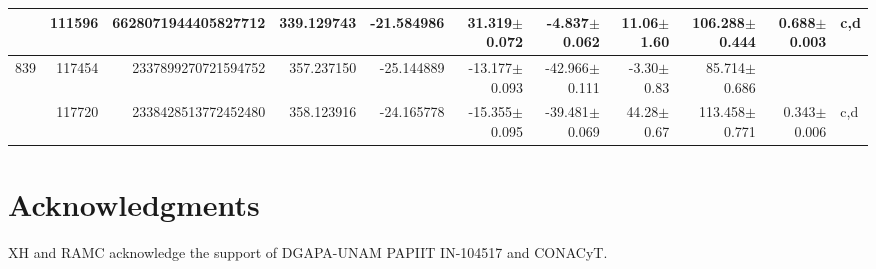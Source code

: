 \documentclass{ws-ijmpd}
\begin{document}
\begin{landscape}
\begin{longtable}{rrrrrrrrrrl}
            &  111596 &      6628071944405827712 &                   339.129743 &                   -21.584986 &                 31.319$\pm$0.072 &                 -4.837$\pm$0.062 &          11.06$\pm$  1.60 &       106.288$\pm$0.444 &                           0.688$\pm$0.003 &                                                c,d \\
 \hline 839 &  117454 &      2337899270721594752 &                   357.237150 &                   -25.144889 &                -13.177$\pm$0.093 &                -42.966$\pm$0.111 &          -3.30$\pm$  0.83 &        85.714$\pm$0.686 &                                           &                                                    \\
            &  117720 &      2338428513772452480 &                   358.123916 &                   -24.165778 &                -15.355$\pm$0.095 &                -39.481$\pm$0.069 &          44.28$\pm$  0.67 &       113.458$\pm$0.771 &                           0.343$\pm$0.006 &                                                c,d \\
\end{longtable}
\end{landscape}	






\section*{Acknowledgments}

XH and RAMC acknowledge the support of DGAPA-UNAM PAPIIT IN-104517 and CONACyT.




\end{document}
